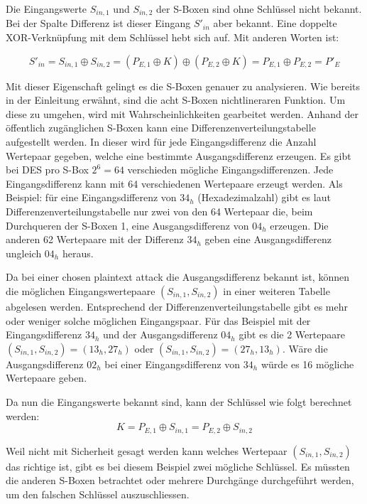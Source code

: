 Die Eingangswerte $S_{in,1}$ und $S_{in,2}$ der S-Boxen sind ohne Schlüssel nicht bekannt. Bei der Spalte \glqq Differenz\grqq{} ist dieser Eingang $S'_{in}$ aber bekannt. Eine doppelte XOR-Verknüpfung mit dem Schlüssel hebt sich auf. Mit anderen Worten ist: 

\begin{equation}\label{equ:Schluessel_Differenz}
S'_{in} = S_{in,1} \oplus S_{in,2} = (P_{E,1} \oplus K) \oplus (P_{E,2} \oplus K) = P_{E,1} \oplus P_{E,2} = P'_{E} 
\end{equation}


Mit dieser Eigenschaft gelingt es die S-Boxen genauer zu analysieren. 
Wie bereits in der Einleitung erwähnt, sind die acht S-Boxen nichtlineraren Funktion. Um diese zu umgehen, wird mit Wahrscheinlichkeiten gearbeitet werden.
Anhand der öffentlich zugänglichen S-Boxen kann eine Differenzenverteilungstabelle aufgestellt werden. In dieser wird für jede Eingangsdifferenz die Anzahl Wertepaar gegeben, welche eine bestimmte Ausgangsdifferenz erzeugen. 
Es gibt bei DES pro S-Box $2^{6} = 64$ verschieden mögliche Eingangsdifferenzen. Jede Eingangsdifferenz kann mit 64 verschiedenen Wertepaare erzeugt werden. Als Beispiel: für eine Eingangsdifferenz von $34_{h}$ (Hexadezimalzahl) gibt es laut Differenzenverteilungstabelle nur zwei von den 64 Wertepaar die, beim Durchqueren der S-Boxen 1, eine Ausgangsdifferenz von $04_{h}$ erzeugen. Die anderen 62 Wertepaare mit der Differenz $34_{h}$ geben eine Ausgangsdifferenz ungleich $04_{h}$ heraus. 

Da bei einer \glqq chosen plaintext attack\grqq{} die Ausgangsdifferenz bekannt ist, können die möglichen Eingangswertepaare $(S_{in,1}, S_{in,2})$ in einer weiteren Tabelle abgelesen werden. Entsprechend der Differenzenverteilungstabelle gibt es mehr oder weniger solche möglichen Eingangspaar.
Für das Beispiel mit der Eingangsdifferenz $34_{h}$ und der Ausgangsdifferenz $04_{h}$ gibt es die 2 Wertepaare $(S_{in,1}, S_{in,2}) = (13_{h}, 27_{h})$ oder $(S_{in,1},S_{in,2}) = (27_{h}, 13_{h})$. Wäre die Ausgangsdifferenz $02_{h}$ bei einer Eingangsdifferenz von $34_{h}$ würde es 16 mögliche Wertepaare geben. 

Da nun die Eingangswerte bekannt sind, kann der Schlüssel wie folgt berechnet werden:
\begin{equation}\label{equ:Schluessel_Loesung}
K = P_{E,1} \oplus S_{in,1} = P_{E,2} \oplus S_{in,2}
\end{equation}

Weil nicht mit Sicherheit gesagt werden kann welches Wertepaar $(S_{in,1}, S_{in,2})$ das richtige ist, gibt es bei diesem Beispiel zwei mögliche Schlüssel. Es müssten die anderen S-Boxen betrachtet oder mehrere Durchgänge durchgeführt werden, um den falschen Schlüssel auszuschliessen. \cite{biham_differential_1990}\cite{noauthor_differenzielle_2019}

